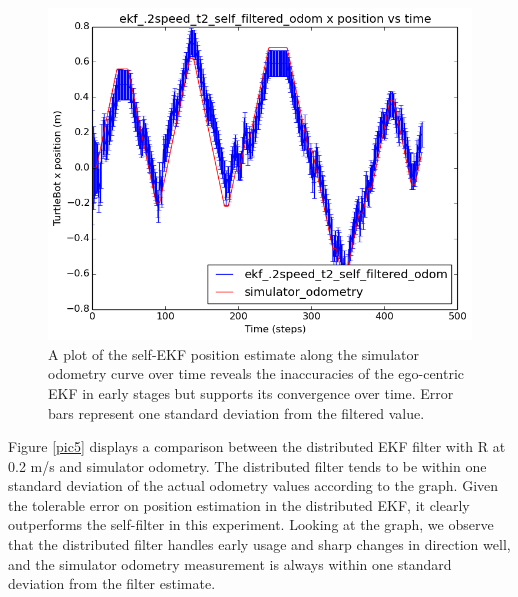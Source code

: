 \documentclass[conference]{IEEEtran} \usepackage[T1]{fontenc} \usepackage[backend=biber, style=ieee]{biblatex}
\begin{document}
\begin{figure}

\centering 
\includegraphics[scale=.45]{ekf_2speed_t2_self_filtered_odom_pos_err_graph}
\caption {A plot of the self-EKF position estimate along the simulator odometry curve over time 
reveals the inaccuracies of the ego-centric EKF in early stages but supports its convergence over time.
Error bars represent one standard deviation from the filtered value.}
\label{pic4} 
\end{figure}

\par
Figure \ref{pic5} displays a comparison between the distributed EKF filter with R at 0.2 m/s and simulator odometry. The 
distributed filter tends to be within one standard deviation of the actual odometry values according to the graph. 
Given the tolerable error on position estimation in the distributed EKF, it clearly outperforms the self-filter 
in this experiment. Looking at the graph, we observe that the distributed filter handles early usage and sharp changes in direction well, 
and the simulator odometry measurement is always within one standard deviation from the filter estimate.
\end{document}
